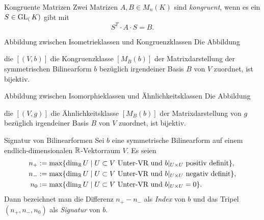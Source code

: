 \documentclass[main.tex]{subfiles}
\begin{document}
\begin{karte}{Kongruente Matrizen}
    Zwei Matrizen \( A,B\in M_n(K) \) sind 
    \textit{kongruent}, wenn es ein \( S\in \operatorname{GL}_(K) \) 
    gibt mit 
    \[ S^T \cdot A \cdot S = B. \]
\end{karte}

\begin{karte}{Abbildung zwischen Isometrieklassen und Kongruenzklassen}
    Die Abbildung 
    \begin{center}
    \end{center}
    die \( [(V,b)] \) die Kongruenzklasse \( [M_B(b)] \) 
    der Matrixdarstellung der symmetrischen Bilinearform \(b\) 
    bezüglich irgendeiner Basis \(B\) von \(V\) zuordnet, 
    ist bijektiv.
\end{karte}

\begin{karte}{Abbildung zwischen Isomorphieklassen und Ähnlichkeitsklassen}
    Die Abbildung 
    \begin{center}
    \end{center}
    die \( [(V,g)] \) die Ähnlichkeitsklasse \( [M_B(b)] \) 
    der Matrixdarstellung von \(g\) bezüglich irgendeiner 
    Basis \(B\) von \(V\) zuordnet, ist bijektiv.
\end{karte}

\begin{karte}{Signatur von Bilinearformen}
    Sei \(b\) eine symmetrische Bilinearform auf 
    einem endlich-dimensionalen \(\mathbb{R}\)-Vektorraum \(V\). 
    Es seien 
    \begin{align*}
        n_+ &:= \max\{ \dim_{\mathbb{R}} U \;\vert\; U \subset V \text{ Unter-VR und } b\vert_{U\times U} \text{ positiv definit} \}, \\
        n_- &:= \max\{ \dim_{\mathbb{R}} U \;\vert\; U \subset V \text{ Unter-VR und } b\vert_{U\times U} \text{ negativ definit} \}, \\
        n_0 &:= \max\{ \dim_{\mathbb{R}} U \;\vert\; U \subset V \text{ Unter-VR und } b\vert_{U\times U} = 0 \}.
    \end{align*}
    Dann bezeichnet man die Differenz \( n_+ - n_- \) 
    als \textit{Index} von \(b\) und das Tripel \( (n_+, n_-, n_0) \)
    als \textit{Signatur} von \(b\).
\end{karte}
\end{document}
